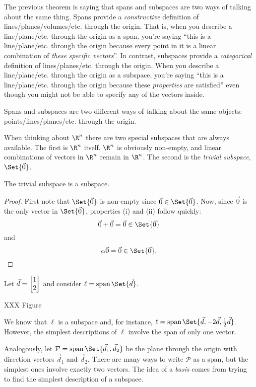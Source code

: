 The previous theorem is saying that spans and subspaces are two ways of talking about the same
thing. Spans provide a \emph{constructive} definition of lines/planes/volumes/etc. through the origin. That is,
when you describe a line/plane/etc. through the origin as a span, you're saying ``this is a line/plane/etc. through the origin
because every point in it is a linear combination of \emph{these specific vectors}''. In contrast, subspaces provide a \emph{categorical}
definition of lines/planes/etc. through the origin. 
When you describe a line/plane/etc. through the origin as a subspace, 
you're saying ``this is a line/plane/etc. through the origin because these \emph{properties} are satisfied'' even though
you might not be able to specify any of the vectors inside.


\begin{emphbox}[Takeaway]
	Spans and subspaces are two different ways of talking about the same objects: points/lines/planes/etc. through the origin.
\end{emphbox}

When thinking about $\R^n$ there are two special subspaces that are always available. The first is $\R^n$ itself.
$\R^n$ is obviously non-empty, and linear combinations of vectors in $\R^n$ remain in $\R^n$. The second is
the \emph{trivial subspace}, $\Set{\vec 0}$.


\begin{theorem}
	The trivial subspace is a subspace.
\end{theorem}
\begin{proof}
	First note that $\Set{\vec 0}$ is non-empty since $\vec 0\in\Set{\vec 0}$. Now, since
	$\vec 0$ is the only vector in $\Set{\vec 0}$, properties (i) and (ii) follow quickly:
	\[
		\vec 0+\vec 0=\vec 0\in \Set{\vec 0}
	\]
	and
	\[
		\alpha\vec 0=\vec 0\in\Set{\vec 0}.
	\]
\end{proof}


Let $\vec d=\mat{1\\2}$ and consider $\ell=\Span\Set{\vec d}$.

XXX Figure

We know that $\ell$ is a subspace and, for instance, $\ell=\Span\Set{\vec d,-2\vec d,\tfrac{1}{2}\vec d}$. However,
the simplest descriptions of $\ell$ involve the span of only one vector.


Analogously, let $\mathcal P=\Span\Set{\vec d_1,\vec d_2}$ be the plane
through the origin with direction vectors $\vec d_1$ and $\vec d_2$. There
are many ways to write $\mathcal P$ as a span, but the simplest ones
involve exactly two vectors. The idea of a \emph{basis} comes
from trying to find the simplest description of a subspace.

